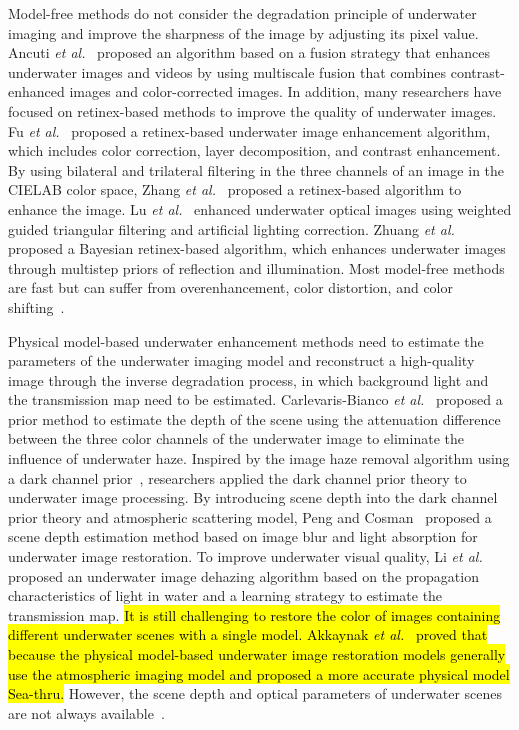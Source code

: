 \documentclass[utf8]{FrontiersinHarvard} %
\begin{document}
Model-free methods do not consider the degradation principle of underwater imaging and improve the sharpness of the image by adjusting its pixel value. Ancuti \textit{et al.}~\citep{2012Enhancing} proposed an algorithm based on a fusion strategy that enhances underwater images and videos by using multiscale fusion that combines contrast-enhanced images and color-corrected images. In addition, many researchers have focused on retinex-based methods to improve the quality of underwater images. Fu \textit{et al.}~\citep{2015A} proposed a retinex-based underwater image enhancement algorithm, which includes color correction, layer decomposition, and contrast enhancement. By using bilateral and trilateral filtering in the three channels of an image in the CIELAB color space, Zhang \textit{et al.}~\citep{ZHANG20171} proposed a retinex-based algorithm to enhance the image. Lu \textit{et al.}~\citep{2016Underwater} enhanced underwater optical images using weighted guided triangular filtering and artificial lighting correction. Zhuang \textit{et al.}~\citep{zhuang2021bayesian} proposed a Bayesian retinex-based algorithm, which enhances underwater images through multistep priors of reflection and illumination. Most model-free methods are fast but can suffer from overenhancement, color distortion, and color shifting~\citep{lu2017underwater}.

Physical model-based underwater enhancement methods need to estimate the parameters of the underwater imaging model and reconstruct a high-quality image through the inverse degradation process, in which background light and the transmission map need to be estimated. Carlevaris-Bianco \textit{et al.}~\citep{2010Initial} proposed a prior method to estimate the depth of the scene using the attenuation difference between the three color channels of the underwater image to eliminate the influence of underwater haze. Inspired by the image haze removal algorithm using a dark channel prior~\citep{2011Single}, researchers applied the dark channel prior theory to underwater image processing. By introducing scene depth into the dark channel prior theory and atmospheric scattering model, Peng and Cosman~\citep{7840002} proposed a scene depth estimation method based on image blur and light absorption for underwater image restoration. To improve underwater visual quality, Li \textit{et al.}~\citep{LI201762} proposed an underwater image dehazing algorithm based on the propagation characteristics of light in water and a learning strategy to estimate the transmission map. \hl{It is still challenging to restore the color of images containing different underwater scenes with a single model. Akkaynak \textit{et al.}~\citep{akkaynak2019sea} proved that because the physical model-based underwater image restoration models generally use the atmospheric imaging model and proposed a more accurate physical model Sea-thru.} However, the scene depth and optical parameters of underwater scenes are not always available~\citep{9001231}.
\end{document}
